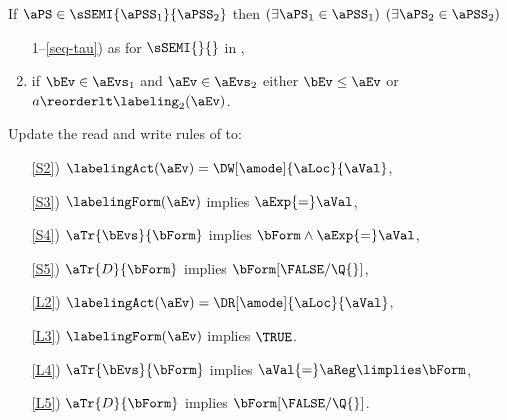 \begin{scope}
  \begin{definition}
    \label{def:independency-co}
    \noindent
    If $\aPS \in \sSEMI{\aPSS_1}{\aPSS_2}$ then $(\exists\aPS_1\in\aPSS_1)$
    $(\exists\aPS_2\in\aPSS_2)$
    \begin{enumerate}
      \setcounter{enumi}{\value{pomsetXSemiCount}}
    \item[1--\ref{seq-tau})] as for $\sSEMI{}{}$ in ,
    \item
      \label{seq-reorder} if $\bEv\in\aEvs_1$ and $\aEv\in\aEvs_2$ either
      $\bEv\le\aEv$ or $a\reorderlt\labeling_2(\aEv)$.
    \end{enumerate}
    Update the read and write rules of  to: %
    \begin{enumerate}
    \item[\ref{S2})]
      $\labelingAct(\aEv) = \DW[\amode]{\aLoc}{\aVal}$,
    \item[\ref{S3})] 
      $\labelingForm(\aEv)$ implies %
      $\aExp{=}\aVal$,
    \item[\ref{S4})]
      $\aTr{\bEvs}{\bForm}$ implies $\bForm \land\aExp{=}\aVal$,
    \item[\ref{S5})]
      $\aTr{\cEvs}{\bForm}$ implies $\bForm[\FALSE/\Q{}]$,
    \item[\ref{L2})]
      $\labelingAct(\aEv) = \DR[\amode]{\aLoc}{\aVal}$,
    \item[\ref{L3})] 
      $\labelingForm(\aEv)$ implies %
      $\TRUE$.
    \item[\ref{L4})]
      $\aTr{\bEvs}{\bForm}$ implies $\aVal{=}\aReg\limplies\bForm$, 
    \item[\ref{L5})]
      $\aTr{\cEvs}{\bForm}$ implies $\bForm[\FALSE/\Q{}]$.
    \end{enumerate}
  \end{definition}


\end{scope}

